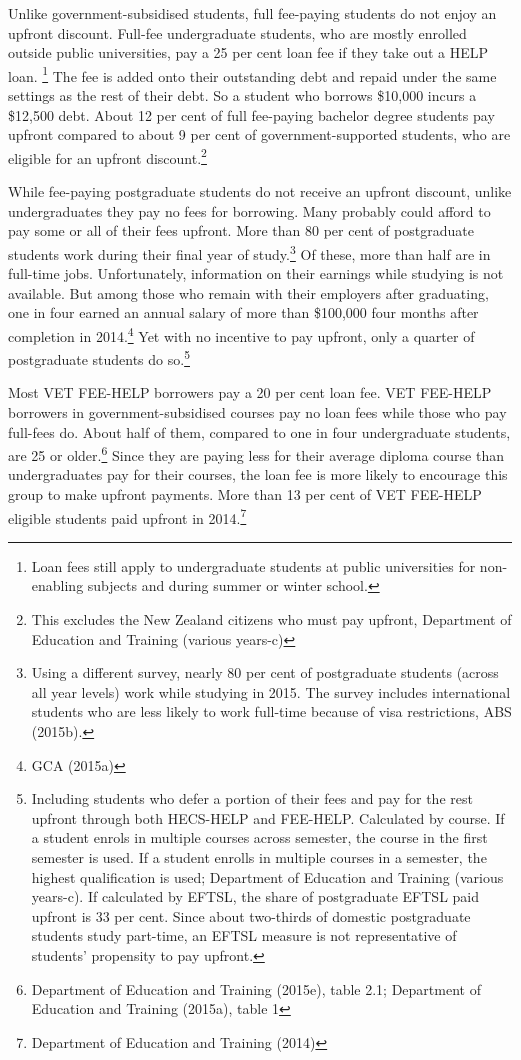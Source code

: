\documentclass[]{book}
\begin{document}
Unlike government-subsidised students, full fee-paying students do not enjoy an upfront discount. Full-fee undergraduate students, who are mostly enrolled outside public universities, pay a 25 per cent loan fee if they take out a HELP loan. \footnote{Loan fees still apply to undergraduate students at public universities for non-enabling subjects and during summer or winter school.} The fee is added onto their outstanding debt and repaid under the same settings as the rest of their debt. So a student who borrows \$10,000 incurs a \$12,500 debt. About 12 per cent of full fee-paying bachelor degree students pay upfront compared to about 9 per cent of government-supported students, who are eligible for an upfront discount.\footnote{This excludes the New Zealand citizens who must pay upfront, Department of Education and Training (various years-c)}

While fee-paying postgraduate students do not receive an upfront discount, unlike undergraduates they pay no fees for borrowing. Many probably could afford to pay some or all of their fees upfront. More than 80 per cent of postgraduate students work during their final year of study.\footnote{Using a different survey, nearly 80 per cent of postgraduate students (across all year levels) work while studying in 2015. The survey includes international students who are less likely to work full-time because of visa restrictions, ABS (2015b).} Of these, more than half are in full-time jobs. Unfortunately, information on their earnings while studying is not available. But among those who remain with their employers after graduating, one in four earned an annual salary of more than \$100,000 four months after completion in 2014.\footnote{GCA (2015a)} Yet with no incentive to pay upfront, only a quarter of postgraduate students do so.\footnote{Including students who defer a portion of their fees and pay for the rest upfront through both HECS-HELP and FEE-HELP. Calculated by course. If a student enrols in multiple courses across semester, the course in the first semester is used. If a student enrolls in multiple courses in a semester, the highest qualification is used; Department of Education and Training (various years-c). If calculated by EFTSL, the share of postgraduate EFTSL paid upfront is 33 per cent. Since about two-thirds of domestic postgraduate students study part-time, an EFTSL measure is not representative of students' propensity to pay upfront.}

Most VET FEE-HELP borrowers pay a 20 per cent loan fee. VET FEE-HELP borrowers in government-subsidised courses pay no loan fees while those who pay full-fees do. About half of them, compared to one in four undergraduate students, are 25 or older.\footnote{Department of Education and Training (2015e), table 2.1; Department of Education and Training (2015a), table 1} Since they are paying less for their average diploma course than undergraduates pay for their courses, the loan fee is more likely to encourage this group to make upfront payments. More than 13 per cent of VET FEE-HELP eligible students paid upfront in 2014.\footnote{Department of Education and Training (2014)}
\end{document}
